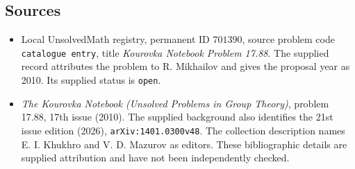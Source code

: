 \documentclass[11pt]{article}
\begin{document}
\subsection{Sources}
\begin{itemize}
\item Local UnsolvedMath registry, permanent ID \(701390\), source problem code \texttt{catalogue entry}, title \emph{Kourovka Notebook Problem 17.88}. The supplied record attributes the problem to R. Mikhailov and gives the proposal year as 2010. Its supplied status is \texttt{open}.
\item \emph{The Kourovka Notebook (Unsolved Problems in Group Theory)}, problem 17.88, 17th issue (2010). The supplied background also identifies the 21st issue edition (2026), \texttt{arXiv:1401.0300v48}. The collection description names E. I. Khukhro and V. D. Mazurov as editors. These bibliographic details are supplied attribution and have not been independently checked.
\end{itemize}
\end{document}
